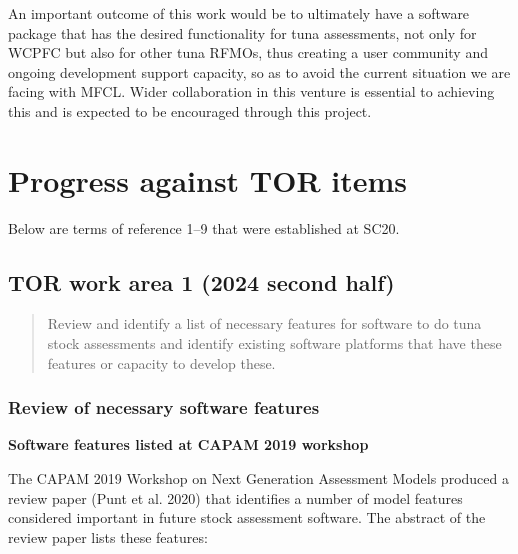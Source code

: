 \documentclass{SCreport}
\begin{document}
An important outcome of this work would be to ultimately have a software package
that has the desired functionality for tuna assessments, not only for WCPFC but
also for other tuna RFMOs, thus creating a user community and ongoing
development support capacity, so as to avoid the current situation we are facing
with MFCL. Wider collaboration in this venture is essential to achieving this
and is expected to be encouraged through this project.

\newpage

\section{Progress against TOR items}

Below are terms of reference 1--9 that were established at SC20.

\subsection{TOR work area 1 (2024 second half)}

\begin{quote}\sf
  Review and identify a list of necessary features for software to do tuna stock
  assessments and identify existing software platforms that have these features
  or capacity to develop these.
\end{quote}

\vspace{2ex}

\subsubsection{Review of necessary software features}

\vspace{2ex}

\textbf{Software features listed at CAPAM 2019 workshop}

\vspace{1ex}

The CAPAM 2019 Workshop on Next Generation Assessment Models produced a review
paper (Punt et al. 2020) that identifies a number of model features considered
important in future stock assessment software. The abstract of the review paper
lists these features:
\end{document}
